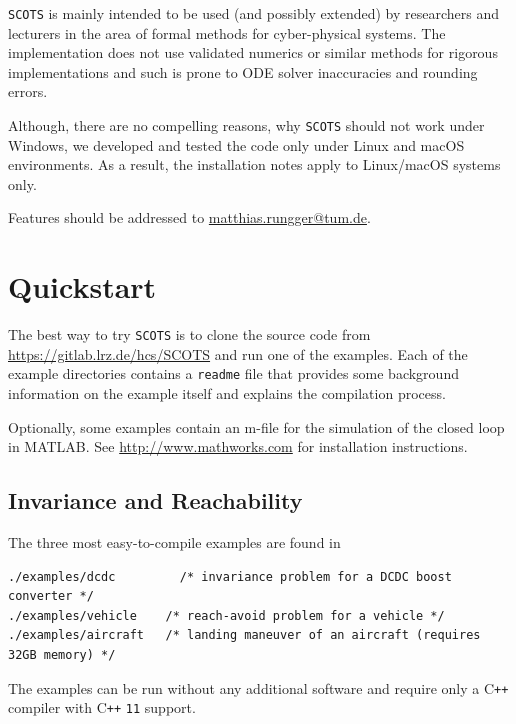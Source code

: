 \documentclass[a4paper]{amsart}
\newcommand\Cpp{C\texttt{++} }
\begin{document}
{\tt SCOTS} is mainly intended to be used (and possibly extended) by researchers and
lecturers in the area of formal methods for
cyber-physical systems. The implementation does not use validated numerics or similar
methods for rigorous implementations and such is prone to ODE solver
inaccuracies and rounding errors.

Although, there are no compelling reasons, why {\tt SCOTS} should not work
under Windows, we developed and tested the code only under Linux and macOS
environments. As a result, the installation notes apply to
Linux/macOS systems only. 

Features should be addressed to \href{mailto:matthias.rungger@tum.de}{matthias.rungger@tum.de}. 

\section{Quickstart}

The best way to try {\tt SCOTS} is to clone the source code from
\url{https://gitlab.lrz.de/hcs/SCOTS} and run one of the examples. Each of the
example directories contains a {\tt readme} file that provides some background
information on the example itself and explains the compilation
process. 

Optionally, some examples contain an m-file for the simulation of the
closed loop in MATLAB. See \url{http://www.mathworks.com} for installation
instructions.


\subsection{Invariance and Reachability}

The three most easy-to-compile examples are found in
\begin{lstlisting}[basicstyle=\small\ttfamily]
./examples/dcdc      	/* invariance problem for a DCDC boost converter */ 
./examples/vehicle    /* reach-avoid problem for a vehicle */ 
./examples/aircraft   /* landing maneuver of an aircraft (requires 32GB memory) */ 
\end{lstlisting}
The examples can be run without any additional software and require only a
\Cpp compiler with \Cpp{\tt11} support. 
\end{document}
